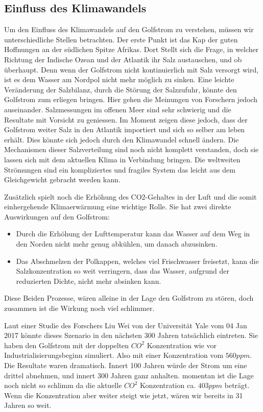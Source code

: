 \subsection{Einfluss des Klimawandels} 
Um den Einfluss des Klimawandels auf den Golfstrom zu verstehen, müssen wir unterschiedliche Stellen betrachten.
Der erste Punkt ist das Kap der guten Hoffnungen an der südlichen Spitze Afrikas.
Dort Stellt sich die Frage, in welcher Richtung der Indische Ozean und der Atlantik ihr Salz austauschen, und ob überhaupt. Denn wenn der Golfstrom nicht kontinuierlich mit Salz versorgt wird, ist es dem Wasser am Nordpol nicht mehr möglich zu sinken. Eine leichte Veränderung der Salzbilanz, durch die Störung der Salzzufuhr,  könnte den Golfstrom zum erliegen bringen. Hier gehen die Meinungen von Forschern jedoch auseinander. Salzmessungen im offenen Meer sind sehr schwierig und die Resultate mit Vorsicht zu geniessen.
Im Moment zeigen diese jedoch, dass der Golfstrom weiter Salz in den Atlantik importiert und sich so selber am leben erhält. Dies könnte sich jedoch durch den Klimawandel schnell ändern. Die Mechanismen dieser Salzverteilung sind noch nicht komplett verstanden, doch sie lassen sich mit dem aktuellen Klima in Verbindung bringen. Die weltweiten Strömungen sind ein kompliziertes und fragiles System das leicht aus dem Gleichgewicht gebracht werden kann. 

Zusätzlich spielt noch die Erhöhung des CO2-Gehaltes in der Luft und die somit einhergehende Klimaerwärmung eine wichtige Rolle. Sie hat zwei direkte Auswirkungen auf den Golfstrom:

\begin{itemize}
	\item Durch die Erhöhung der Lufttemperatur kann das Wasser auf dem Weg in den Norden nicht mehr genug abkühlen, um danach abzusinken.
	\item Das Abschmelzen der Polkappen, welches viel Frischwasser freisetzt, kann die Salzkonzentration so weit verringern, dass das Wasser, aufgrund der reduzierten Dichte, nicht mehr absinken kann.
\end{itemize}

Diese Beiden Prozesse, wären alleine in der Lage den Golfstrom zu stören, doch zusammen ist die Wirkung noch viel schlimmer.

Laut einer Studie des Forschers Liu Wei von der Universität Yale vom 04 Jan 2017 \cite{thermohalin:liuwei} könnte dieses Szenario in den nächsten 300 Jahren tatsächlich eintreten. Sie haben den Golfstrom mit der doppelten $CO^2$ Konzentration wie vor Industrialisierungsbeginn simuliert. Also mit einer Konzentration vom $560ppm$. Die Resultate waren dramatisch. Innert 100 Jahren würde der Strom um eine drittel abnehmen, und innert 300 Jahren ganz anhalten. momentan ist die Lage noch nicht so schlimm da die aktuelle $CO^2$ Konzentration ca. $403ppm$ beträgt. Wenn die Konzentration aber weiter steigt wie jetzt, wären wir bereits in 31 Jahren so weit. \cite{thermohalin:c02}

